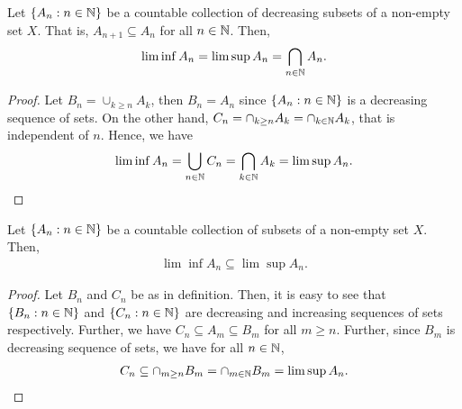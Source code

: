 \documentclass[a4paper,english,12pt]{article}
\begin{document}
\begin{prop}\label{Prop:DecreasingSet} Let $\{A_n: n \in \mathbb{N}\}$ be a countable collection of decreasing subsets of a non-empty set $X$. That is, $A_{n+1} \subseteq A_{n}$ for all $n \in \mathbb{N}$. Then,
\begin{align*}
\lim\inf A_n = \lim\sup A_n = \bigcap_{n \in \mathbb{N}} A_n.
\end{align*}
\end{prop}
\begin{proof} Let $B_n = \cup_{k \geq n}A_k$, then $B_n = A_n$ since $\{A_n: n \in \mathbb{N}\}$ is a decreasing sequence of sets.  On the other hand, $C_n = \cap_{k \geq n}A_k = \cap_{k \in \mathbb{N}}A_k$, that is independent of $n$. Hence, we have 
\begin{align*}
\lim\inf A_n = \bigcup_{n \in \mathbb{N}}C_n = \bigcap_{k \in \mathbb{N}}A_k = \lim\sup A_n.
\end{align*}
\end{proof}
\begin{prop} Let $\{A_n: n \in \mathbb{N}\}$ be a countable collection of subsets of a non-empty set $X$. Then,
\begin{align*}
\lim\inf A_n \subseteq \lim\sup A_n.
\end{align*}
\end{prop}
\begin{proof} Let $B_n$ and $C_n$ be as in definition. Then, it is easy to see that $\{B_n: n \in \mathbb{N}\}$ and $\{C_n: n \in \mathbb{N}\}$ are decreasing and increasing sequences of sets respectively. Further, we have $C_n \subseteq A_m \subseteq B_m$ for all $m \geq n$. Further, since $B_m$ is decreasing sequence of sets, we have for all $n \in \mathbb{N}$,
\begin{align*}
C_n \subseteq \cap_{m \geq n} B_m = \cap_{m \in \mathbb{N}} B_m = \lim\sup A_n.
\end{align*}
\end{proof}
\end{document}

